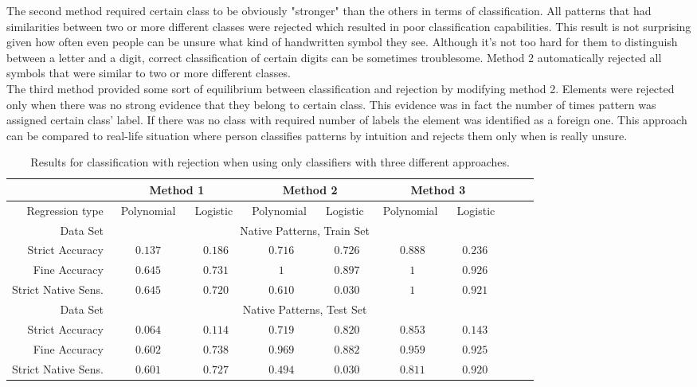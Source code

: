 \documentclass{llncs}
\begin{document}
The second method required certain class to be obviously "stronger" than the others in terms of classification. All patterns that had similarities between two or more different classes were rejected which resulted in poor classification capabilities. This result is not surprising given how often even people can be unsure what kind of handwritten symbol they see. Although it's not too hard for them to distinguish between a letter and a digit, correct classification of certain digits can be sometimes troublesome. Method 2 automatically rejected all symbols that were similar to two or more different classes. \\

The third method provided some sort of equilibrium between classification and rejection by modifying method 2. Elements were rejected only when there was no strong evidence that they belong to certain class. This evidence was in fact the number of times pattern was assigned certain class' label. If there was no class with required number of labels the element was identified as a foreign one. This approach can be compared to real-life situation where person classifies patterns by intuition and rejects them only when is really unsure. 

\begin{table}[!b]
	\vspace{-12pt}
	\centering
	\caption{Results for classification with rejection when using only classifiers with three different approaches.}
	\vspace{-6pt}
	\setlength{\tabcolsep}{3pt}
	\renewcommand{\arraystretch}{1}
	{\footnotesize
		\begin{tabular}{|r||c|c|c||c|c|c||c|c|c|}
			\hline
			& \multicolumn{2}{c||}{Method 1} & \multicolumn{2}{c||}{Method 2} & \multicolumn{2}{c|}{Method 3}\\
			\hline
			Regression type & $\;\;$Polynomial$\;\;$ & $\,$Logistic$\;\;$ & $\,$Polynomial$\;\;$ & $\,$Logistic$\;\;$ & $\,$Polynomial$\;\;$ & $\,$Logistic  \\
			\hline
			Data Set & \multicolumn{6}{c|}{Native Patterns, Train Set} \\
			\hline
			Strict Accuracy     & $0.137$ & $0.186$ & $0.716$ & $0.726$ & $0.888$ & $0.236$ \\
			Fine Accuracy       & $0.645$     & $0.731$ & $1$ & $0.897$ & $1$ & $0.926$ \\
			Strict Native Sens. & $0.645$ & $0.720$ & $0.610$ & $0.030$ & $1$ & $0.921$ \\
			\hline
			Data Set & \multicolumn{6}{c|}{Native Patterns, Test Set} \\
			\hline
			Strict Accuracy  & $0.064$ & $0.114$ & $0.719$ & $0.820$ & $0.853$ & $0.143$ \\
			Fine Accuracy       & $0.602$ & $0.738$ & $0.969$ & $0.882$ & $0.959$ & $0.925$ \\
			Strict Native Sens. & $0.601$ & $0.727$ & $0.494$ & $0.030$ & $0.811$ & $0.920$ \\
			\hline
		\end{tabular}
	}
	\vspace{-6pt}
	\label{tab:NativeNoForeign2}
\end{table}
\end{document}
